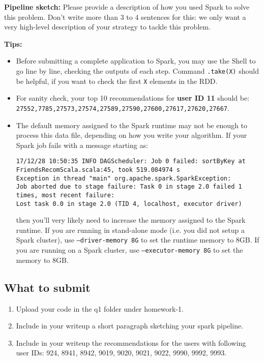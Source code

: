 {\bf Pipeline sketch:} Please provide a description of how you used Spark to solve this problem. Don't write more than 3 to 4 sentences for this: we only want a very high-level description of your strategy to tackle this problem.

{\bf Tips:} 
\begin{itemize}
    \item 
    Before submitting a complete application to Spark, you may use the Shell to go line by line, checking the outputs of each step. Command {\tt .take(X)} should be helpful, if you want to check the first {\tt X} elements in the RDD.
    \item 
    For sanity check, your top 10 recommendations for \textbf{user ID 11} should be:\\ {\tt 27552,7785,27573,27574,27589,27590,27600,27617,27620,27667}.
    \item 
    The default memory assigned to the Spark runtime may not be enough to process this data file, depending on how you write your algorithm. If your Spark job fails with a message starting as:

\begin{Verbatim}[fontsize=\scriptsize]
17/12/28 10:50:35 INFO DAGScheduler: Job 0 failed: sortByKey at FriendsRecomScala.scala:45, took 519.084974 s
Exception in thread "main" org.apache.spark.SparkException:
Job aborted due to stage failure: Task 0 in stage 2.0 failed 1 times, most recent failure:
Lost task 0.0 in stage 2.0 (TID 4, localhost, executor driver)
\end{Verbatim}

then you'll very likely need to increase the memory assigned to the Spark runtime.  If you are running in stand-alone mode (i.e. you did not setup a Spark cluster), use {\tt --driver-memory 8G} to set the runtime memory to 8GB. If you are running on a Spark cluster, use {\tt --executor-memory 8G} to set the memory to 8GB. 

\end{itemize}


\subsection*{What to submit}
\begin{enumerate}[(1)]
\item Upload your code in the q1 folder under homework-1.
\item Include in your writeup a short paragraph sketching your spark pipeline.
\item Include in your writeup the recommendations for the users with following user IDs: 924, 8941, 8942, 9019, 9020, 9021, 9022, 9990, 9992, 9993.
\end{enumerate}
